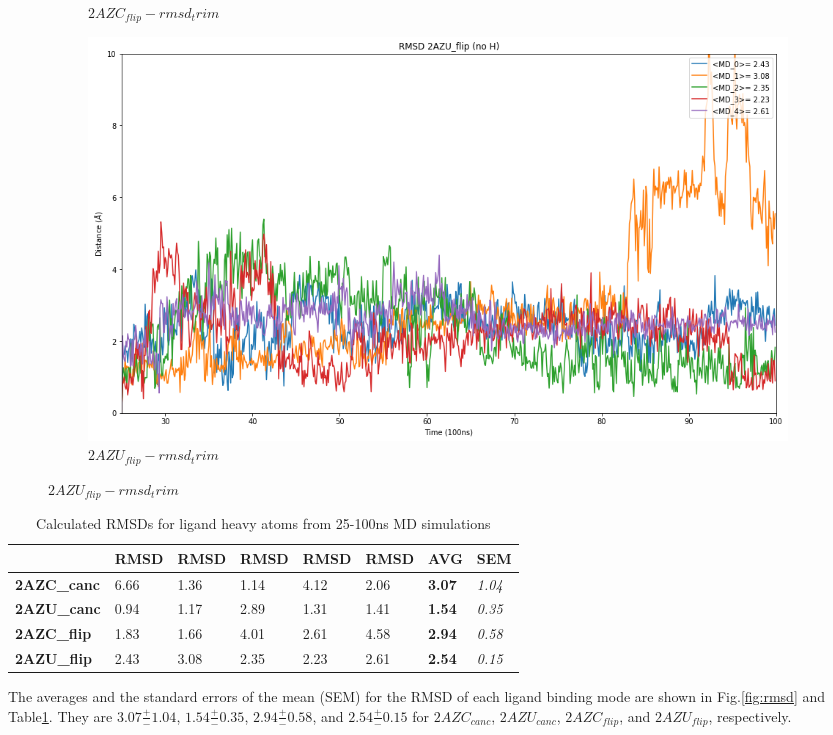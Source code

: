 \documentclass[fleqn,10pt]{wlscirep}
\begin{document}
\begin{figure}[!ht]
\begin{subfigure}{.45\textwidth}
     \caption{$2AZC_{flip}-rmsd_trim$}
     \label{fig:2AZC_flip-rmsd_trim}
   \end{subfigure}
    \begin{subfigure}{.45\textwidth}
     \centering
     \includegraphics[width=.95\linewidth]{2AZU_flip/2AZU_flip-rmsd-trim.png}
     \caption{$2AZU_{flip}-rmsd_trim$}
     \label{fig:2AZU_flip-rmsd_trim}
   \end{subfigure}
\end{figure}  

\begin{table}[!ht]
\caption{Calculated RMSDs for ligand heavy atoms from 25-100ns MD simulations}
\label{table:rmsd}
\begin{tabular}{|l|l|l|l|l|l|l|l|}
\hline
                    & RMSD & RMSD & RMSD & RMSD & RMSD & \textbf{AVG}  & SEM           \\ \hline
\textbf{2AZC\_canc} & 6.66 & 1.36 & 1.14 & 4.12 & 2.06 & \textbf{3.07} & \textit{1.04} \\ \hline
\textbf{2AZU\_canc} & 0.94 & 1.17 & 2.89 & 1.31 & 1.41 & \textbf{1.54} & \textit{0.35} \\ \hline
\textbf{2AZC\_flip} & 1.83 & 1.66 & 4.01 & 2.61 & 4.58 & \textbf{2.94} & \textit{0.58} \\ \hline
\textbf{2AZU\_flip} & 2.43 & 3.08 & 2.35 & 2.23 & 2.61 & \textbf{2.54} & \textit{0.15} \\ \hline

\end{tabular}
\end{table}

The averages and the standard errors of the mean (SEM) for the RMSD of each ligand binding mode are shown in Fig.\ref{fig:rmsd} and Table\ref{table:rmsd}.
They are $3.07 \frac{+}{-} 1.04$, $1.54 \frac{+}{-} 0.35$, $2.94 \frac{+}{-} 0.58$, and $2.54 \frac{+}{-} 0.15$ for $2AZC_{canc}$, $2AZU_{canc}$, $2AZC_{flip}$, and $2AZU_{flip}$, respectively.
\end{document}
